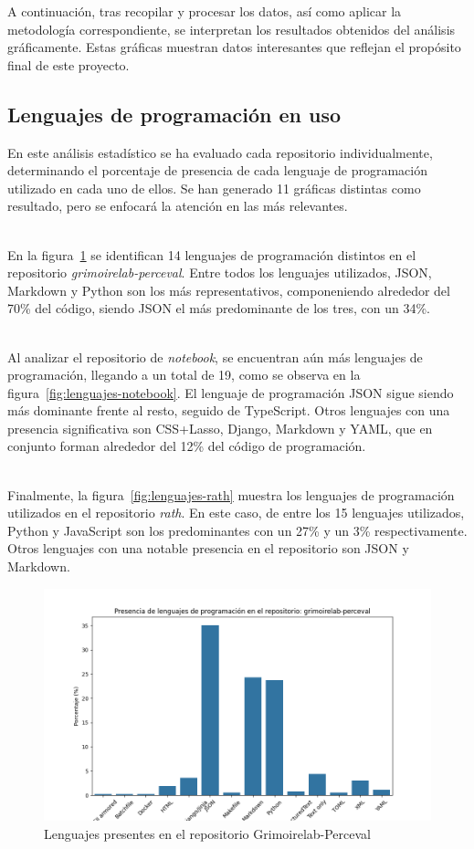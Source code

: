 \documentclass[a4paper, 12pt]{book}
\begin{document}
A continuación, tras recopilar y procesar los datos, así como aplicar la metodología correspondiente, se interpretan los resultados obtenidos del análisis gráficamente. Estas gráficas
muestran datos interesantes que reflejan el propósito final de este proyecto.

\subsection{Lenguajes de programación en uso}
\label{subsec:lenguajes}

En este análisis estadístico se ha evaluado cada repositorio individualmente, determinando el porcentaje de presencia de cada lenguaje de programación utilizado en cada uno de ellos. Se han generado 11
gráficas distintas como resultado, pero se enfocará la atención en las más relevantes.

\\En la figura~\ref{fig:lenguajes-perceval} se identifican 14 lenguajes de programación distintos en el repositorio \textit{grimoirelab-perceval}. Entre todos los lenguajes utilizados,
JSON, Markdown y Python son los más representativos, componeniendo alrededor del 70\% del código, siendo JSON el más predominante de los tres, con un 34\%.

\\Al analizar el repositorio de \textit{notebook}, se encuentran aún más lenguajes de programación, llegando a un total de 19, como se observa en la figura~\ref{fig:lenguajes-notebook}.
El lenguaje de programación JSON sigue siendo más dominante frente al resto, seguido de TypeScript. Otros lenguajes con una presencia significativa son CSS+Lasso, Django, Markdown y YAML,
que en conjunto forman alrededor del 12\% del código de programación.

\\Finalmente, la figura~\ref{fig:lenguajes-rath} muestra los lenguajes de programación utilizados en el repositorio \textit{rath}. En este caso, de entre los 15 lenguajes utilizados, Python y 
JavaScript son los predominantes con un 27\% y un 3\% respectivamente. Otros lenguajes con una notable presencia en el repositorio son JSON y Markdown.

\begin{figure}
  \centering
  \includegraphics[width=16cm, keepaspectratio]{img/languages_grimoirelab-perceval.png}
  \caption{Lenguajes presentes en el repositorio Grimoirelab-Perceval}
  \label{fig:lenguajes-perceval}
\end{figure}
\end{document}
